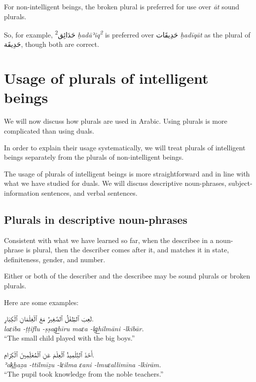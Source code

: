 \documentclass[
  10pt,
]{book}
\begin{document}
For non-intelligent beings, the broken plural is preferred for use over \emph{āt} sound plurals.

So, for example, \foreignlanguage{arabic}{حَدَائِق\textsuperscript{2}} \emph{ḥadāʾiq\textsuperscript{2}} is preferred over \foreignlanguage{arabic}{حَدِيقَات} \emph{ḥadīqāt} as the plural of \foreignlanguage{arabic}{حَدِيقَة}, though both are correct.

\section{Usage of plurals of intelligent beings}\label{usage-of-plurals-of-intelligent-beings}

We will now discuss how plurals are used in Arabic. Using plurals is more complicated than using duals.

In order to explain their usage systematically, we will treat plurals of intelligent beings separately from the plurals of non-intelligent beings.

The usage of plurals of intelligent beings is more straightforward and in line with what we have studied for duals. We will discuss descriptive noun-phrases, subject-information sentences, and verbal sentences.

\subsection{Plurals in descriptive noun-phrases}\label{plurals-in-descriptive-noun-phrases}

Consistent with what we have learned so far, when the describee in a noun-phrase is plural, then the describer comes after it, and matches it in state, definiteness, gender, and number.

Either or both of the describer and the describee may be sound plurals or broken plurals.

Here are some examples:

\foreignlanguage{arabic}{لَعِبَ ٱلطِّفْلُ ٱلصَّغِيرُ مَعَ ٱلْغِلْمَانِ ٱلْکِبَارِ.}\\
\emph{laɛiba -ṭṭiflu -ṣṣag͟hīru maɛa -lg͟hilmāni -lkibār.}\\
\enquote{The small child played with the big boys.}

\foreignlanguage{arabic}{أَخَذَ ٱلتِّلْمِيذُ ٱلْعِلْمَ عَنِ ٱلْمُعَلِّمِينَ ٱلْکِرَامِ.}\\
\emph{ʾak͟haẕa -ttilmīẕu -lɛilma ɛani -lmuɛallimīna -lkirām.}\\
\enquote{The pupil took knowledge from the noble teachers.}
\end{document}
